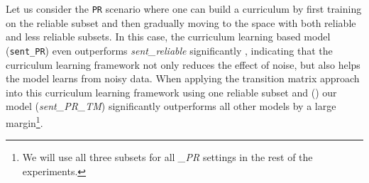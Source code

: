 Let us consider the \texttt{PR} scenario where one can build a curriculum by first training on the
reliable subset and then gradually moving to the space with both reliable and less
reliable subsets. In this case, the curriculum learning based model
(\texttt{sent\_PR}) even  outperforms \emph{sent\_reliable} significantly  ,
indicating that the curriculum learning framework not only reduces the effect
of noise, but also helps the model learns from noisy data. When applying the
transition matrix approach into this curriculum learning framework using one reliable
subset and 
()
our model (\emph{sent\_PR\_TM}) significantly outperforms all
other models by a large margin\footnote{We will use all three subsets for all
\emph{\_PR} settings in the rest of the experiments.}. 


